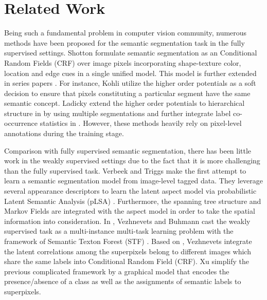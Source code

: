 \section{Related Work}
Being such a fundamental problem in computer vision community, numerous methods have been proposed for the semantic segmentation task in the fully supervised settings. Shotton \etal \cite{shotton2006textonboost} formulate semantic segmentation as an Conditional Random Fields (CRF) over image pixels incorporating shape-texture color, location and edge cues in a single unified model. This model is further extended in series papers \cite{kohli2009robust,ladicky2009associative,ladicky2010graph}. For instance, Kohli \etal utilize the higher order potentials \cite{kohli2009robust} as a soft decision to ensure that pixels constituting a particular segment have the same semantic concept. Ladicky \etal extend the higher order potentials to hierarchical structure in \cite{ladicky2009associative} by using multiple segmentations and further integrate label co-occurrence statistics in \cite{ladicky2010graph}. However, these methods heavily rely on pixel-level annotations during the training stage.

Comparison with fully supervised semantic segmentation, there has been little work in the weakly supervised settings due to the fact that it is more challenging than the fully supervised task. Verbeek and Triggs \cite{verbeek2007region} make the first attempt to learn a semantic segmentation model from image-level tagged data. They leverage several appearance descriptors to learn the latent aspect model via probabilistic Latent Semantic Analysis (pLSA) \cite{hofmann1999probabilistic}. Furthermore, the spanning tree structure and Markov Fields are integrated with the aspect model in order to take the spatial information into consideration. In \cite{vezhnevets2010towards}, Vezhnevets and Buhmann cast the weakly supervised task as a multi-instance multi-task learning problem with the framework of Semantic Texton Forest (STF) \cite{shotton2008semantic}. Based on \cite{vezhnevets2010towards}, Vezhnevets \etal \cite{vezhnevets2011weakly,vezhnevets2012weakly} integrate the latent correlations among the superpixels belong to different images which share the same labels into Conditional Random Field (CRF). Xu \etal \cite{xu2014tell} simplify the previous complicated framework by a graphical model that encodes the presence/absence of a class as well as the assignments of semantic labels to superpixels.

